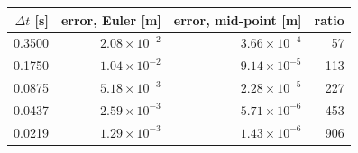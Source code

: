 \begin{tabular}{rrrr}
  \toprule
  $\Delta t$ [s] & error, Euler [m] & error, mid-point [m] & ratio \\
  \midrule
  0.3500 & $2.08\times 10^{-2}$ & $3.66\times 10^{-4}$ & 57 \\
  0.1750 & $1.04\times 10^{-2}$ & $9.14\times 10^{-5}$ & 113 \\
  0.0875 & $5.18\times 10^{-3}$ & $2.28\times 10^{-5}$ & 227 \\
  0.0437 & $2.59\times 10^{-3}$ & $5.71\times 10^{-6}$ & 453 \\
  0.0219 & $1.29\times 10^{-3}$ & $1.43\times 10^{-6}$ & 906 \\
  \bottomrule
\end{tabular}
